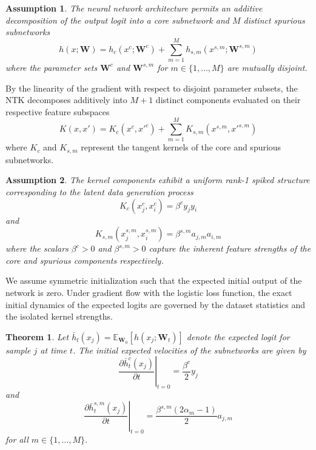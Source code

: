 \documentclass[letter,11pt]{article}
\newtheorem{theorem}{Theorem}
\newtheorem{assumption}{Assumption}
\begin{document}
\begin{assumption}
The neural network architecture permits an additive decomposition of the output logit into a core subnetwork and $M$ distinct spurious subnetworks
\begin{equation}
h(x; \mathbf{W}) = h_c(x^c; \mathbf{W}^c) + \sum_{m=1}^M h_{s,m}(x^{s,m}; \mathbf{W}^{s,m})
\end{equation}
where the parameter sets $\mathbf{W}^c$ and $\mathbf{W}^{s,m}$ for $m \in \{1, \dots, M\}$ are mutually disjoint.
\end{assumption}

By the linearity of the gradient with respect to disjoint parameter subsets, the NTK decomposes additively into $M+1$ distinct components evaluated on their respective feature subspaces
\begin{equation}
K(x, x') = K_c(x^c, x'^c) + \sum_{m=1}^M K_{s,m}(x^{s,m}, x'^{s,m})
\end{equation}
where $K_c$ and $K_{s,m}$ represent the tangent kernels of the core and spurious subnetworks.

\begin{assumption}
The kernel components exhibit a uniform rank-1 spiked structure corresponding to the latent data generation process
\begin{equation}
K_c(x_j^c, x_i^c) = \beta^c y_j y_i
\end{equation}
and
\begin{equation}
K_{s,m}(x_j^{s,m}, x_i^{s,m}) = \beta^{s,m} a_{j,m} a_{i,m}
\end{equation}
where the scalars $\beta^c > 0$ and $\beta^{s,m} > 0$ capture the inherent feature strengths of the core and spurious components respectively.
\end{assumption}

We assume symmetric initialization such that the expected initial output of the network is zero. Under gradient flow with the logistic loss function, the exact initial dynamics of the expected logits are governed by the dataset statistics and the isolated kernel strengths.

\begin{theorem}
Let $\bar{h}_t(x_j) = \mathbb{E}_{\mathbf{W}_0}[h(x_j; \mathbf{W}_t)]$ denote the expected logit for sample $j$ at time $t$. The initial expected velocities of the subnetworks are given by
\begin{equation}
\left. \frac{\partial \bar{h}_t^c(x_j)}{\partial t} \right|_{t=0} = \frac{\beta^c}{2} y_j
\end{equation}
and
\begin{equation}
\left. \frac{\partial \bar{h}_t^{s,m}(x_j)}{\partial t} \right|_{t=0} = \frac{\beta^{s,m} (2\alpha_m - 1)}{2} a_{j,m}
\end{equation}
for all $m \in \{1, \dots, M\}$.
\end{theorem}
\end{document}
